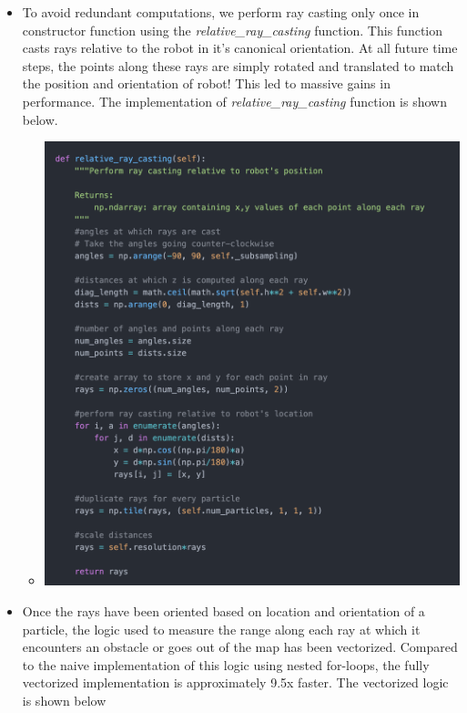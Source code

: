 \documentclass[12pt, a4paper]{article}
\begin{document}
\begin{itemize}
  \item To avoid redundant computations, we perform ray casting only once in constructor function using the \textit{relative\_ray\_casting} function. This function casts rays relative to the robot in it's canonical orientation. At all future time steps, the points along these rays are simply rotated and translated to match the position and orientation of robot! This led to massive gains in performance. The implementation of \textit{relative\_ray\_casting} function is shown below.
  \begin{itemize}
    \item 
    \begin{minipage}[t]{\linewidth}
      \vspace{0pt}
      \begin{center}
        \includegraphics[scale=0.25]{./results/ray_casting_opt_1.png}
        \label{fig:sm_1}
      \end{center}
    \end{minipage}
  \end{itemize}
  \item Once the rays have been oriented based on location and orientation of a particle, the logic used to measure the range along each ray at which it encounters an obstacle or goes out of the map has been vectorized. Compared to the naive implementation of this logic using nested for-loops, the fully vectorized implementation is approximately 9.5x faster.  The vectorized logic is shown below

\end{itemize}
\end{document}
